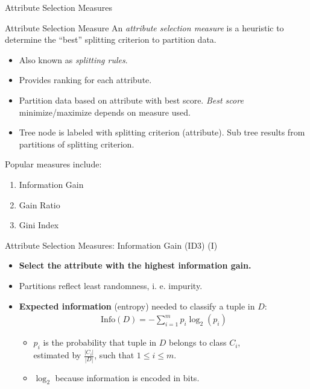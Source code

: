 \begin{frame}{Attribute Selection Measures}
	\begin{block}{Attribute Selection Measure}
		An \textit{attribute selection measure} is a heuristic to determine the ``best'' splitting criterion to partition data.
	\end{block}

	\begin{itemize}
		\item Also known as \textit{splitting rules}.
		\item Provides ranking for each attribute.
		\item Partition data based on attribute with best score. \textit{Best score} minimize/maximize depends on measure used.
		\item Tree node is labeled with splitting criterion (attribute). Sub tree results from partitions of splitting criterion.
	\end{itemize}

	Popular measures include:
	\begin{enumerate}
		\item Information Gain
		\item Gain Ratio
		\item Gini Index
	\end{enumerate}
\end{frame}

\begin{frame}{Attribute Selection Measures: Information Gain (ID3) (I)}
	\begin{itemize}
		\item \textbf{Select the attribute with the highest information gain.}
		\item Partitions reflect least randomness, i. e. impurity.
		\item \textbf{Expected information} (entropy) needed to classify a tuple in $D$:
		      \begin{align*}
			      \text{Info}(D) = -\sum_{i=1}^{m}p_i \log_2(p_i)
		      \end{align*}

		      \begin{itemize}
			      \item $p_i$ is the probability that tuple in $D$ belongs to class $C_i$,\\
			            estimated by $\frac{|C_i|}{|D|}$, such that $1 \leq i \leq m$.
			      \item $\log_2$ because information is encoded in bits.
		      \end{itemize}
	\end{itemize}
\end{frame}

